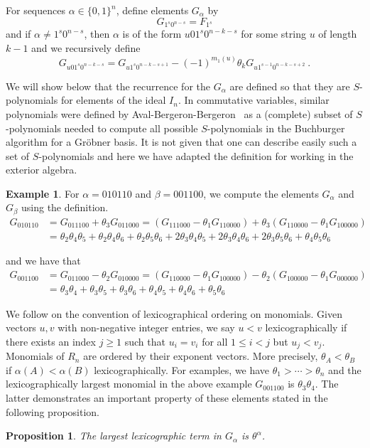 \documentclass[11pt]{amsart}
\newtheorem{prop}[theorem]{Proposition}
\theoremstyle{definition}
\newtheorem{example}[theorem]{Example}
\numberwithin{equation}{section}
\begin{document}
For sequences $\alpha \in \{ 0, 1 \}^n$, define elements $G_\alpha$ by
\begin{equation}\label{eq:Gdef1}
G_{1^s0^{n-s}} = F_{1^s}
\end{equation}
and if $\alpha \neq 1^s 0^{n-s}$, then $\alpha$ is of the form $u01^s0^{n-k-s}$ for some string $u$
of length $k-1$ and we recursively define
\begin{equation}\label{eq:Gdef2}
G_{u01^s0^{n-k-s}} = G_{u1^s0^{n-k-s+1}} - (-1)^{m_1(u)} \theta_k G_{u1^{s-1}0^{n-k-s+2}}~.
\end{equation}

We will show below that the recurrence for the
$G_\alpha$ are defined so that they are $S$-polynomials \cite{CLO}
for elements of the ideal $I_n$.
In commutative variables, similar polynomials were defined by Aval-Bergeron-Bergeron~\cite{AB,ABB}
as a (complete) subset of $S$-polynomials needed to compute all possible
$S$-polynomials in the Buchburger algorithm for a Gr\"obner basis.
It is not given that one can describe easily such a set of $S$-polynomials and here we have adapted
the definition for working in the exterior algebra.

\begin{example} For $\alpha = 010110$ and $\beta = 001100$, we compute
the elements $G_\alpha$ and $G_\beta$ using the definition.
\begin{align*}
G_{010110} &= G_{011100} + \theta_3 G_{011000} = (G_{111000} - \theta_1 G_{110000})
+ \theta_3(G_{110000} - \theta_1 G_{100000})\\
&= \theta_2 \theta_4 \theta_5 + \theta_2 \theta_4 \theta_6 + \theta_2 \theta_5 \theta_6
+ 2 \theta_3 \theta_4 \theta_5 + 2 \theta_3 \theta_4 \theta_6 + 2 \theta_3 \theta_5 \theta_6
+ \theta_4 \theta_5 \theta_6
\end{align*}

and we have that
\begin{align*}
G_{001100} &= G_{011000} - \theta_2 G_{010000} = (G_{110000} - \theta_1 G_{100000})
- \theta_2 (G_{100000} - \theta_1 G_{000000})\\
&= \theta_3 \theta_4 + \theta_3 \theta_5 + \theta_3 \theta_6 + \theta_4 \theta_5 + \theta_4 \theta_6 + \theta_5 \theta_6
\end{align*}
\end{example}

We follow \cite{CLO} on the convention of lexicographical ordering on monomials.
Given vectors $u,v$ with non-negative integer entries, we say $u < v$ lexicographically if
there exists an index $j \ge 1$ such that $u_{i} = v_{i}$ for all $1 \le i < j$ but
$u_{j} < v_{j}$.  Monomials of $R_{n}$ are ordered by their exponent vectors.  More
precisely, $\theta_{A} < \theta_{B}$ if $\alpha(A) < \alpha(B)$ lexicographically.  For examples, we have
$\theta_{1} > \cdots > \theta_{n}$ and the lexicographically largest monomial in the above example
$G_{001100}$ is $\theta_{3}\theta_{4}$.  The latter demonstrates an important property of these
elements stated in the following proposition.  
\begin{prop}\label{prop:largest}
The largest lexicographic term in $G_\alpha$ is $\theta^\alpha$.
\end{prop}
\end{document}
